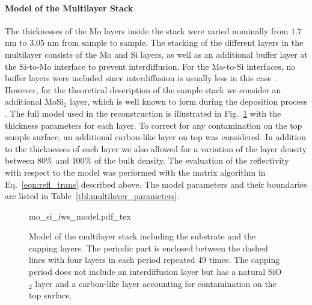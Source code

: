 \paragraph{Model of the Multilayer Stack} \label{sec:mo_si_model}
The thicknesses of the Mo layers inside the stack were varied nominally from $1.7$ nm to $3.05$ nm from sample to sample. The stacking of the different layers in the multilayer consists of the Mo and Si layers, as well as an additional buffer layer at the Si-to-Mo interface to prevent interdiffusion. For the Mo-to-Si interfaces, no buffer layers were included since interdiffusion is usually less in this case \cite{petford-long_highresolution_1987}. However, for the theoretical description of the sample stack we consider an additional MoSi$_2$ layer, which is well known to form during the deposition process \cite{bajt_investigation_2001}. The full model used in the reconstruction is illustrated in Fig.~\ref{fig:model} with the thickness parameters for each layer. To correct for any contamination on the top sample surface, an additional carbon-like layer on top was considered. In addition to the thicknesses of each layer we also allowed for a variation of the layer density between $80\%$ and $100\%$ of the bulk density. The evaluation of the reflectivity with respect to the model was performed with the matrix algorithm in Eq.~\eqref{eqn:refl_trans} described above. The model parameters and their boundaries are listed in Table~\ref{tbl:multilayer_parameters}.
\begin{figure}[htbp]
    \def\svgwidth{0.7\textwidth}
    \selectfont\footnotesize
    {mo_si_iws_model.pdf_tex}
    \caption{Model of the multilayer stack including the substrate and the capping layers. The periodic part is enclosed between the dashed lines with four layers in each period repeated 49 times. The capping period does not include an interdiffusion layer but has a natural SiO$_2$ layer and a carbon-like layer accounting for contamination on the top surface.}
    \label{fig:model}
\end{figure}
